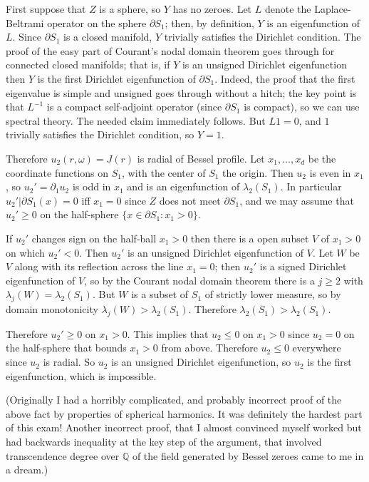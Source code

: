 \documentclass[10pt]{article}
\newcommand{\QQ}{\mathbb{Q}}
\theoremstyle{definition}
\begin{document}
First suppose that $Z$ is a sphere, so $Y$ has no zeroes.
Let $L$ denote the Laplace-Beltrami operator on the sphere $\partial S_1$; then, by definition, $Y$ is an eigenfunction of $L$.
Since $\partial S_1$ is a closed manifold, $Y$ trivially satisfies the Dirichlet condition.
The proof of the easy part of Courant's nodal domain theorem goes through for connected closed manifolds; that is, if $Y$ is an unsigned Dirichlet eigenfunction then $Y$ is the first Dirichlet eigenfunction of $\partial S_1$.
Indeed, the proof that the first eigenvalue is simple and unsigned goes through without a hitch; the key point is that $L^{-1}$ is a compact self-adjoint operator (since $\partial S_1$ is compact), so we can use spectral theory.
The needed claim immediately follows.
But $L1 = 0$, and $1$ trivially satisfies the Dirichlet condition, so $Y = 1$.

Therefore $u_2(r, \omega) = J(r)$ is radial of Bessel profile.
Let $x_1, \dots, x_d$ be the coordinate functions on $S_1$, with the center of $S_1$ the origin.
Then $u_2$ is even in $x_1$, so $u_2' = \partial_1 u_2$ is odd in $x_1$ and is an eigenfunction of $\lambda_2(S_1)$.
In particular $u_2'|\partial S_1(x) = 0$ iff $x_1 = 0$ since $Z$ does not meet $\partial S_1$, and we may assume that $u_2' \geq 0$ on the half-sphere $\{x \in \partial S_1: x_1 > 0\}$.

If $u_2'$ changes sign on the half-ball $x_1 > 0$ then there is a open subset $V$ of $x_1 > 0$ on which $u_2' < 0$.
Then $u_2'$ is an unsigned Dirichlet eigenfunction of $V$.
Let $W$ be $V$ along with its reflection across the line $x_1 = 0$; then $u_2'$ is a signed Dirichlet eigenfunction of $V$, so by the Courant nodal domain theorem there is a $j \geq 2$ with $\lambda_j(W) = \lambda_2(S_1)$.
But $W$ is a subset of $S_1$ of strictly lower measure, so by domain monotonicity $\lambda_j(W) > \lambda_2(S_1)$.
Therefore $\lambda_2(S_1) > \lambda_2(S_1)$.

Therefore $u_2' \geq 0$ on $x_1 > 0$. This implies that $u_2 \leq 0$ on $x_1 > 0$ since $u_2 = 0$ on the half-sphere that bounds $x_1 > 0$ from above.
Therefore $u_2 \leq 0$ everywhere since $u_2$ is radial.
So $u_2$ is an unsigned Dirichlet eigenfunction, so $u_2$ is the first eigenfunction, which is impossible.

(Originally I had a horribly complicated, and probably incorrect proof of the above fact by properties of spherical harmonics.
It was definitely the hardest part of this exam!
Another incorrect proof, that I almost convinced myself worked but had backwards inequality at the key step of the argument, that involved transcendence degree over $\QQ$ of the field generated by Bessel zeroes came to me in a dream.)
\end{document}
